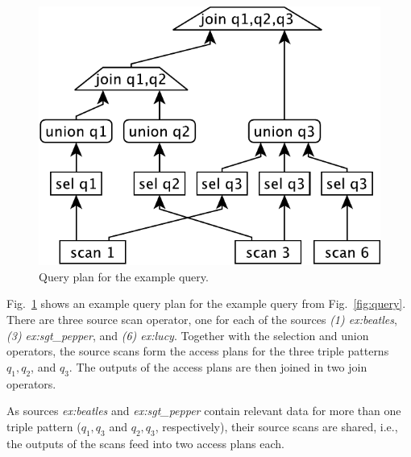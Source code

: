 
\begin{figure}[htb]
  \centering
  \includegraphics[width=0.6\linewidth]{figs/plan-crop.pdf}
  \caption{Query plan for the example query.}
\label{fig:plan}
\end{figure}

\begin{example}
  Fig.~\ref{fig:plan} shows an example query plan for the example
  query from Fig.~\ref{fig:query}. There are three source scan
  operator, one for each of the sources \emph{(1) ex:beatles},
  \emph{(3) ex:sgt\_pepper}, and \emph{(6) ex:lucy}. Together with the
  selection and union operators, the source scans form the access
  plans for the three triple patterns $q_1, q_2$, and $q_3$.  The
  outputs of the access plans are then joined in two join operators.

  As sources \emph{ex:beatles} and \emph{ex:sgt\_pepper} contain
  relevant data for more than one triple pattern ($q_1,q_3$ and
  $q_2,q_3$, respectively), their source scans are shared, i.e., the
  outputs of the scans feed into two access plans each.
\end{example}


